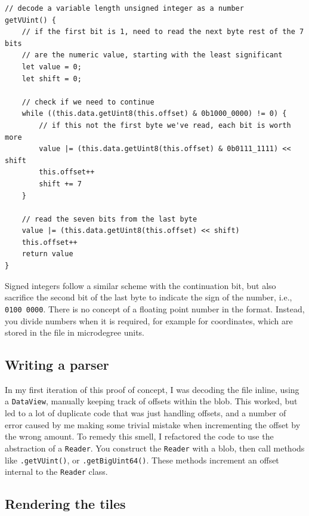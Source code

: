 \documentclass{final_report}
\begin{document}
\begin{lstlisting}[caption=Parsing variable length integers]
// decode a variable length unsigned integer as a number
getVUint() {
    // if the first bit is 1, need to read the next byte rest of the 7 bits
    // are the numeric value, starting with the least significant
    let value = 0;
    let shift = 0;

    // check if we need to continue
    while ((this.data.getUint8(this.offset) & 0b1000_0000) != 0) {
        // if this not the first byte we've read, each bit is worth more
        value |= (this.data.getUint8(this.offset) & 0b0111_1111) << shift
        this.offset++
        shift += 7
    }

    // read the seven bits from the last byte
    value |= (this.data.getUint8(this.offset) << shift)
    this.offset++
    return value
}
\end{lstlisting}

Signed integers follow a similar scheme with the continuation bit, but also sacrifice the second bit of the last byte to indicate the sign of the number, i.e., \texttt{0100 0000}. There is no concept of a floating point number in the format. Instead, you divide numbers when it is required, for example for coordinates, which are stored in the file in microdegree units.

\subsection{Writing a parser}

In my first iteration of this proof of concept, I was decoding the file inline, using a \texttt{DataView}, manually keeping track of offsets within the blob. This worked, but led to a lot of duplicate code that was just handling offsets, and a number of error caused by me making some trivial mistake when incrementing the offset by the wrong amount. To remedy this smell, I refactored the code to use the abstraction of a \texttt{Reader}. You construct the \texttt{Reader} with a blob, then call methods like \texttt{.getVUint()}, or \texttt{.getBigUint64()}. These methods increment an offset internal to the \texttt{Reader} class.

\subsection{Rendering the tiles}
\end{document}
